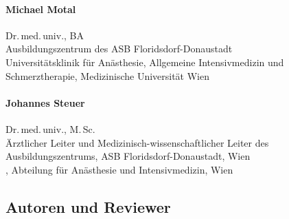 \begin{raggedright}
  \bigskip

  \begin{minipage}{\linewidth}\raggedright
    \paragraph{Michael Motal}
    Dr.\,med.\,univ., BA
    \\[.25\baselineskip]
    \noindent{}Ausbildungszentrum des {\color{AltBlueDark}ASB
    Florids\-dorf-Donau\-stadt}
    \\[.25\baselineskip]
    {\color{AltBlueDark}Universitätsklinik für Anästhesie, Allgemeine 
    Intensivmedizin und Schmerztherapie},  
    Medizinische Universität Wien

  \end{minipage}

  \bigskip

  \begin{minipage}{\linewidth}\raggedright
    \paragraph{Johannes Steuer}
    Dr.\,med.\,univ., M.\,Sc.
    \\[.25\baselineskip]
    \noindent{}Ärztlicher Leiter und Medizinisch-wissenschaftlicher Leiter des Ausbildungszentrums, 
    {\color{AltBlueDark}ASB Florids\-dorf-Donau\-stadt}, 
    Wien
    \\[.25\baselineskip]
    , 
    Abteilung für Anästhesie und Intensivmedizin, 
    Wien
  \end{minipage}






\subsection*{Autoren und Reviewer}

  \begin{minipage}{\linewidth}\raggedright

\end{minipage}
\end{raggedright}
